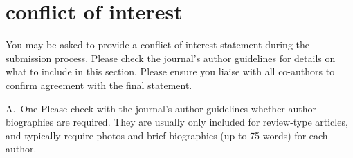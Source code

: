 \documentclass[num-refs]{nbdt-article}
\begin{document}
\section*{conflict of interest}
You may be asked to provide a conflict of interest statement during the submission process. Please check the journal's author guidelines for details on what to include in this section. Please ensure you liaise with all co-authors to confirm agreement with the final statement.

\printendnotes



\begin{biography}{A.~One}
Please check with the journal's author guidelines whether author biographies are required. They are usually only included for review-type articles, and typically require photos and brief biographies (up to 75 words) for each author.
\bigskip
\bigskip
\end{biography}

\end{document}
